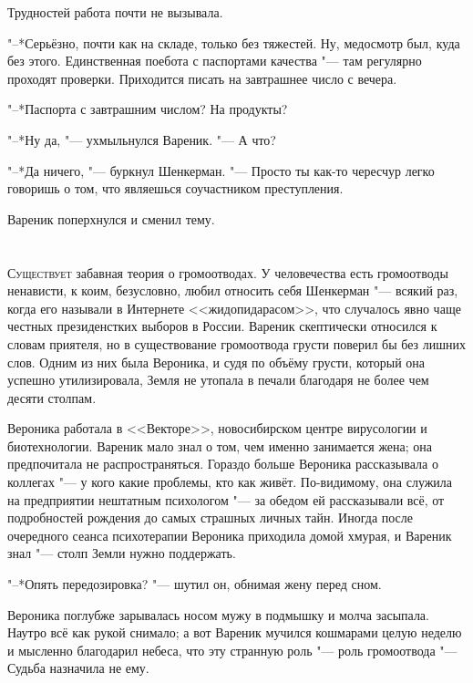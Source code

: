 Трудностей работа почти не вызывала.

"--*Серьёзно, почти как на складе, только без тяжестей.
Ну, медосмотр был, куда без этого.
Единственная поебота с паспортами качества "--- там регулярно проходят проверки.
Приходится писать на завтрашнее число с вечера.

"--*Паспорта с завтрашним числом?
На продукты?

"--*Ну да, "--- ухмыльнулся Вареник.
"--- А что?

"--*Да ничего, "--- буркнул Шенкерман.
"--- Просто ты как-то чересчур легко говоришь о том, что являешься соучастником преступления.

Вареник поперхнулся и сменил тему.

\chapter{}

\lettrine[lines=4,slope=0pt,nindent=3pt]{С}{уществует} забавная теория о громоотводах.
У человечества есть громоотводы ненависти, к коим, безусловно, любил относить себя Шенкерман "--- всякий раз, когда его называли в Интернете <<жидопидарасом>>, что случалось явно чаще честных президенстких выборов в России.
Вареник скептически относился к словам приятеля, но в существование громоотвода грусти поверил бы без лишних слов.
Одним из них была Вероника, и судя по объёму грусти, который она успешно утилизировала, Земля не утопала в печали благодаря не более чем десяти столпам.

Вероника работала в <<Векторе>>, новосибирском центре вирусологии и биотехнологии.
Вареник мало знал о том, чем именно занимается жена;
она предпочитала не распространяться.
Гораздо больше Вероника рассказывала о коллегах "--- у кого какие проблемы, кто как живёт.
По-видимому, она служила на предприятии нештатным психологом "--- за обедом ей рассказывали всё, от подробностей рождения до самых страшных личных тайн.
Иногда после очередного сеанса психотерапии Вероника приходила домой хмурая, и Вареник знал "--- столп Земли нужно поддержать.

"--*Опять передозировка? "--- шутил он, обнимая жену перед сном.

Вероника поглубже зарывалась носом мужу в подмышку и молча засыпала.
Наутро всё как рукой снимало;
а вот Вареник мучился кошмарами целую неделю и мысленно благодарил небеса, что эту странную роль "--- роль громоотвода "--- Судьба назначила не ему.

